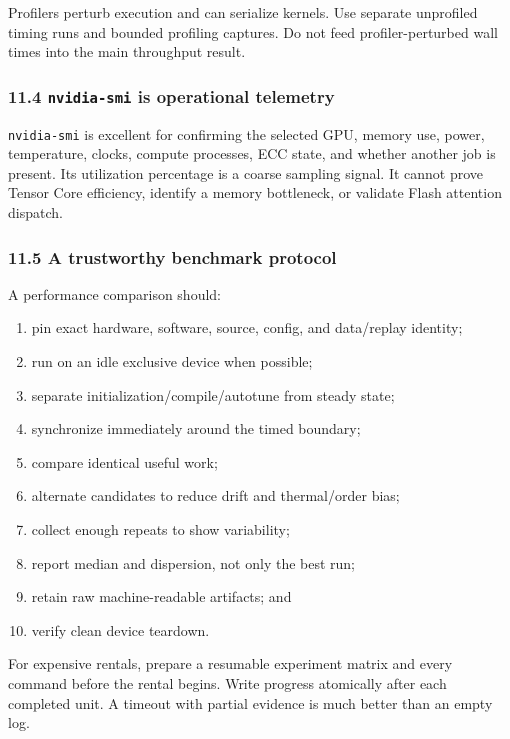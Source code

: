 \documentclass[
  10pt,
  letterpaper,
]{article}
\providecommand{\tightlist}{%
  \setlength{\itemsep}{0pt}\setlength{\parskip}{0pt}}
\begin{document}
Profilers perturb execution and can serialize kernels. Use separate
unprofiled timing runs and bounded profiling captures. Do not feed
profiler-perturbed wall times into the main throughput result.

\subsubsection{\texorpdfstring{11.4 \texttt{nvidia-smi} is operational
telemetry}{11.4 nvidia-smi is operational telemetry}}\label{114-nvidia-smi-is-operational-telemetry}

\texttt{nvidia-smi} is excellent for confirming the selected GPU, memory
use, power, temperature, clocks, compute processes, ECC state, and
whether another job is present. Its utilization percentage is a coarse
sampling signal. It cannot prove Tensor Core efficiency, identify a
memory bottleneck, or validate Flash attention dispatch.

\subsubsection{11.5 A trustworthy benchmark
protocol}\label{115-a-trustworthy-benchmark-protocol}

A performance comparison should:

\begin{enumerate}
\def\labelenumi{\arabic{enumi}.}
\tightlist
\item
  pin exact hardware, software, source, config, and data/replay
  identity;
\item
  run on an idle exclusive device when possible;
\item
  separate initialization/compile/autotune from steady state;
\item
  synchronize immediately around the timed boundary;
\item
  compare identical useful work;
\item
  alternate candidates to reduce drift and thermal/order bias;
\item
  collect enough repeats to show variability;
\item
  report median and dispersion, not only the best run;
\item
  retain raw machine-readable artifacts; and
\item
  verify clean device teardown.
\end{enumerate}

For expensive rentals, prepare a resumable experiment matrix and every
command before the rental begins. Write progress atomically after each
completed unit. A timeout with partial evidence is much better than an
empty log.
\end{document}
